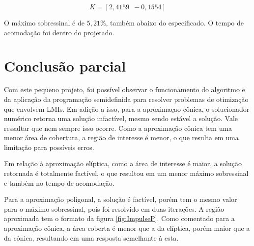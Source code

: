 \begin{equation}
K = \left[2,4159 \enspace -0,1554\right]\label{res:GanhoP}
\end{equation}

O máximo sobressinal é de $5,21\%$, também abaixo do especificado. O tempo de acomodação foi dentro do projetado.

\section{Conclusão parcial}
Com este pequeno projeto, foi possível observar o funcionamento do algoritmo e da aplicação da programação semidefinida para resolver problemas de otimização que envolvem LMIs. Em adição a isso, para a aproximaçao cônica, o solucionador numérico retorna uma solução infactível, mesmo sendo estável a solução. Vale ressaltar que nem sempre isso ocorre. Como a aproximação cônica tem uma menor área de cobertura, a região de interesse é menor, o que resulta em uma limitação para possíveis erros.

Em relação à aproximação elíptica, como a área de interesse é maior, a solução retornada é totalmente factível, o que resultou em um menor máximo sobressinal e também no tempo de acomodação.

Para a aproximação poligonal, a solução é factível, porém tem o mesmo valor para o máximo sobressinal, pois foi resolvido em duas iterações. A região aproximada tem o formato da figura \ref{fig:ImpulseP}. Como comentado para a aproximação cônica, a área coberta é menor que a da elíptica, porém maior que a da cônica, resultando em uma resposta semelhante à esta.